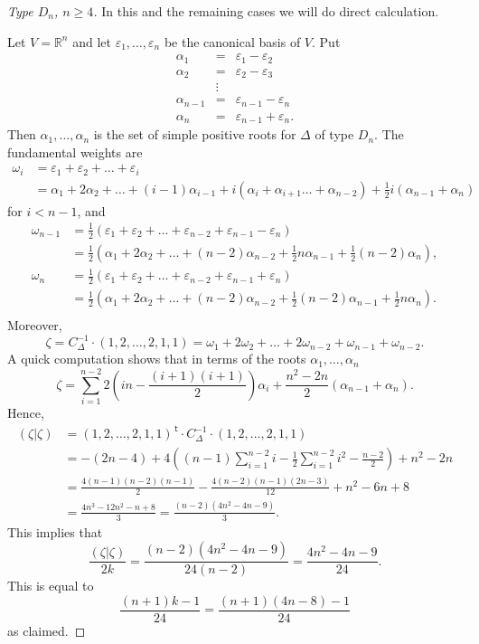 \documentclass{article}
\theoremstyle{definition}
\renewcommand{\top}{\,\mathsf{t}}
\begin{document}
\begin{proof}[Type $D_n$, $n \geq 4$]
	In this and the remaining cases we will do direct calculation. 
	
	Let $V=\mathbb{R}^n$ and let $\varepsilon_1, \dots, \varepsilon_n$ be the canonical basis of $V$. Put
	\[
	\begin{array}{rcl}
	\alpha_1 & = &\varepsilon_1- \varepsilon_2 \\
	\alpha_2 & = &\varepsilon_2- \varepsilon_3 \\
	& \vdots &  \\
	\alpha_{n-1} & = &\varepsilon_{n-1} - \varepsilon_n \\
	\alpha_{n} & =  & \varepsilon_{n-1} + \varepsilon_n.
	\end{array}
	\]
	Then $\alpha_1,\dots,\alpha_n$ is the set of simple positive roots for $\Delta$ of type $D_n$. The fundamental weights are
	\[ 
	\begin{aligned}
	\omega_i & = \varepsilon_1 + \varepsilon_2 + \dots + \varepsilon_i\\
	& = \alpha_1 +2 \alpha_2 + \dots + (i-1)\alpha_{i-1} +i(\alpha_i+\alpha_{i+1}\dots+\alpha_{n-2})+\frac{1}{2}i(\alpha_{n-1}+\alpha_{n}) 
	\end{aligned}
	\]
	for $i < n-1$, and
	\[
	\begin{aligned}
	\omega_{n-1} & = \frac{1}{2}(\varepsilon_1 + \varepsilon_2 + \dots + \varepsilon_{n-2} +\varepsilon_{n-1}-\varepsilon_{n}) \\
	& = \frac{1}{2}(\alpha_1 + 2 \alpha_2 + \dots + (n-2)\alpha_{n-2}+\frac{1}{2}n\alpha_{n-1}+\frac{1}{2}(n-2)\alpha_n), \\
	\omega_{n} & = \frac{1}{2}(\varepsilon_1 + \varepsilon_2 + \dots + \varepsilon_{n-2} +\varepsilon_{n-1}+\varepsilon_{n}) \\
	& = \frac{1}{2}(\alpha_1 + 2 \alpha_2 + \dots + (n-2)\alpha_{n-2}+\frac{1}{2}(n-2)\alpha_{n-1}+\frac{1}{2}n\alpha_n). \\
	\end{aligned}
	\]
	Moreover,
	\[ \zeta = C_{\Delta}^{-1} \cdot (1,2,\dots,2,1,1) = \omega_1 + 2\omega_{2} + \dots + 2 \omega_{n-2}+ \omega_{n-1} + \omega_{n-2}. \]
	A quick computation shows that in terms of the roots $\alpha_1,\dots,\alpha_n$
	\[ \zeta= \sum_{i=1}^{n-2} 2\left(in - \frac{(i+1)(i+1)}{2}\right)\alpha_i+ \frac{n^2-2n}{2}(\alpha_{n-1}+\alpha_{n}). \]
	Hence,
	\[ 
	\begin{aligned}
	(\zeta|\zeta) & = (1,2,\dots,2,1,1)^{\top} \cdot C_{\Delta}^{-1} \cdot (1,2,\dots,2,1,1)  \\
	& = -(2n-4)+4 \left((n-1)\sum_{i=1}^{n-2}i -\frac{1}{2}\sum_{i=1}^{n-2}i^2 - \frac{n-2}{2}\right)+n^2-2n \\
	& = \frac{4(n-1)(n-2)(n-1)}{2}-\frac{4(n-2)(n-1)(2n-3)}{12}+n^2-6n+8 \\
	& = \frac{4 n^3 - 12n^2  -n+ 8}{3}=\frac{(n-2)(4n^2-4n-9)}{3}.
	\end{aligned}
	\]
	This implies that
	\[ \frac{(\zeta|\zeta)}{2k}=\frac{(n-2)(4n^2-4n-9)}{24(n-2)}=\frac{4n^2-4n-9}{24}. \]
	This is equal to 
	\[ \frac{(n+1)k-1}{24}=\frac{(n+1)(4n-8)-1}{24}\]
	as claimed.
\end{proof}
\end{document}

